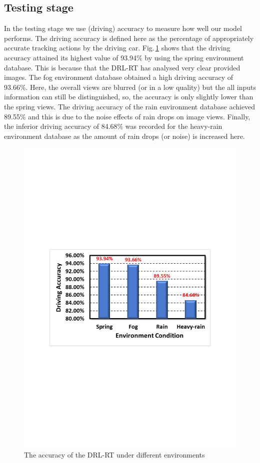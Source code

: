 \documentclass{svproc}
\begin{document}
\subsection{Testing stage} 
	In the testing stage we use (driving) accuracy to measure how well our model performs. The driving accuracy is defined	here as the percentage of appropriately accurate tracking actions by the driving car. Fig.\,\ref{fig:Main_Results} shows that the driving accuracy attained its highest value of 93.94\% by using the spring environment database. This is because that the DRL-RT has analysed very clear provided images. The fog environment database obtained a high driving accuracy of 93.66\%. Here, the overall views are blurred (or in a low quality) but the all inputs information can still be distinguished, so, the accuracy is only slightly lower than the spring views. The driving accuracy of the rain environment database achieved 89.55\% and this is due to the noise effects of rain drops on image views. Finally, the inferior driving accuracy of 84.68\% was recorded for the heavy-rain environment database as the amount of rain drops (or noise) is increased here.
	\begin{figure}[!ht]
		\centering
		\includegraphics[scale=.45,trim=3cm 10.3cm 2.7cm 10.3cm,clip]{Main_Results.pdf}
		\caption{The accuracy of the DRL-RT under different environments}
		\label{fig:Main_Results}
	\end{figure}
	
\end{document}
